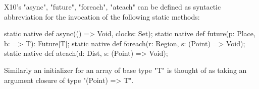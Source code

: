 X10's \xcd"async", \xcd"future", \xcd"foreach", \xcd"ateach"
can be defined as syntactic
abbreviation for the invocation of the following static methods:

\begin{xten}
static native def async(() => Void, clocks: Set);
static native def future(p: Place, b: => T): Future[T];
static native def foreach(r: Region, s: (Point) => Void);
static native def ateach(d: Dist, s: (Point) => Void);
\end{xten}

Similarly an initializer for an array of base type \xcd"T" is thought of as
taking an argument closure of type \xcd"(Point) => T".


